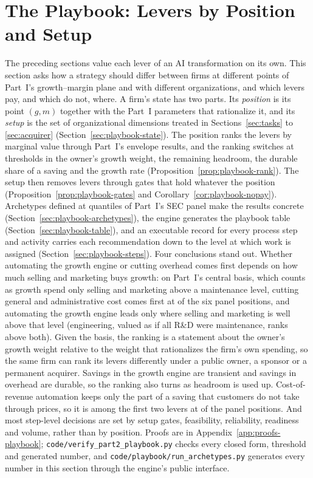 \section{The Playbook: Levers by Position and Setup}\label{sec:playbook}

The preceding sections value each lever of an AI transformation on its own. This section asks how a strategy should differ between firms at different points of Part~I's growth--margin plane and with different organizations, and which levers pay, and which do not, where. A firm's state has two parts. Its \emph{position} is its point $(g,m)$ together with the Part~I parameters that rationalize it, and its \emph{setup} is the set of organizational dimensions treated in Sections~\ref{sec:tasks} to \ref{sec:acquirer} (Section~\ref{sec:playbook-state}). The position ranks the levers by marginal value through Part~I's envelope results, and the ranking switches at thresholds in the owner's growth weight, the remaining headroom, the durable share of a saving and the growth rate (Proposition~\ref{prop:playbook-rank}). The setup then removes levers through gates that hold whatever the position (Proposition~\ref{prop:playbook-gates} and Corollary~\ref{cor:playbook-nopay}). Archetypes defined at quantiles of Part~I's SEC panel make the results concrete (Section~\ref{sec:playbook-archetypes}), the engine generates the playbook table (Section~\ref{sec:playbook-table}), and an executable record for every process step and activity carries each recommendation down to the level at which work is assigned (Section~\ref{sec:playbook-steps}). Four conclusions stand out. Whether automating the growth engine or cutting overhead comes first depends on how much selling and marketing buys growth: on Part~I's central basis, which counts as growth spend only selling and marketing above a maintenance level, cutting general and administrative cost comes first at \pbNGAAheadGENet{} of the six panel positions, and automating the growth engine leads only where selling and marketing is well above that level (engineering, valued as if all R\&D were maintenance, ranks above both). Given the basis, the ranking is a statement about the owner's growth weight relative to the weight that rationalizes the firm's own spending, so the same firm can rank its levers differently under a public owner, a sponsor or a permanent acquirer. Savings in the growth engine are transient and savings in overhead are durable, so the ranking also turns as headroom is used up. Cost-of-revenue automation keeps only the part of a saving that customers do not take through prices, so it is among the first two levers at \pbNCoRTopTwo{} of the panel positions. And most step-level decisions are set by setup gates, feasibility, reliability, readiness and volume, rather than by position. Proofs are in Appendix~\ref{app:proofs-playbook}; \texttt{code/verify\_part2\_playbook.py} checks every closed form, threshold and generated number, and \texttt{code/playbook/run\_archetypes.py} generates every number in this section through the engine's public interface.

